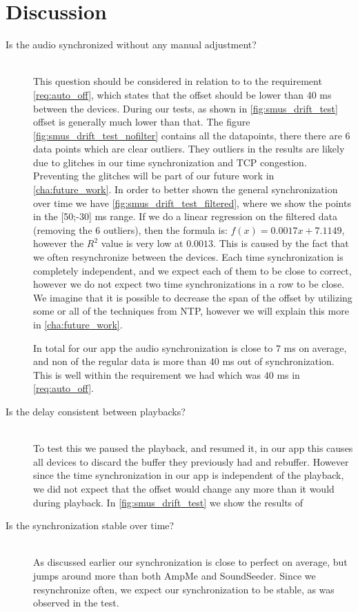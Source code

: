 \section{Discussion}

\begin{description}
    \item[Is the audio synchronized without any manual adjustment?] \hfill \\
        This question should be considered in relation to to the requirement \vref{req:auto_off}, which states that the offset should be lower than 40 ms between the devices.
        During our tests, as shown in \vref{fig:smus_drift_test} offset is generally much lower than that.
        The figure \vref{fig:smus_drift_test_nofilter} contains all the datapoints, there there are 6 data points which are clear outliers.
        They outliers in the results are likely due to glitches in our time synchronization and TCP congestion.
        Preventing the glitches will be part of our future work in \vref{cha:future_work}.
        In order to better shown the general synchronization over time we have \vref{fig:smus_drift_test_filtered}, where we show the points in the [50;-30] ms range.
        If we do a linear regression on the filtered data (removing the 6 outliers), then the formula is: $f(x) = 0.0017x + 7.1149$, however the $R^2$ value is very low at $0.0013$.
        This is caused by the fact that we often resynchronize between the devices.
        Each time synchronization is completely independent, and we expect each of them to be close to correct, however we do not expect two time synchronizations in a row to be close.
        We imagine that it is possible to decrease the span of the offset by utilizing some or all of the techniques from \ac{NTP}, however we will explain this more in \vref{cha:future_work}.

        In total for our app the audio synchronization is close to $7$ ms on average, and non of the regular data is more than $40$ ms out of synchronization.
        This is well within the requirement we had which was $40$ ms in \vref{req:auto_off}.

    \item[Is the delay consistent between playbacks?] \hfill \\
        To test this we paused the playback, and resumed it, in our app this causes all devices to discard the buffer they previously had and rebuffer.
        However since the time synchronization in our app is independent of the playback, we did not expect that the offset would change any more than it would during playback.
        In \vref{fig:smus_drift_test} we show the results of 

    \item[Is the synchronization stable over time?] \hfill \\
        As discussed earlier our synchronization is close to perfect on average, but jumps around more than both AmpMe and SoundSeeder.
        Since we resynchronize often, we expect our synchronization to be stable, as was observed in the test.
\end{description}
